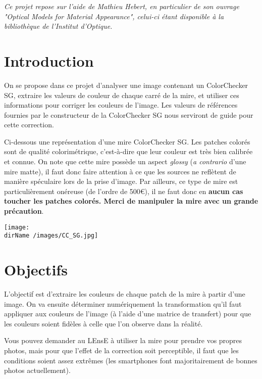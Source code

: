 
\textit{Ce projet repose sur l'aide de Mathieu Hebert, en particulier de son ouvrage "Optical Models for Material Appearance", celui-ci étant disponible à la bibliothèque de l'Institut d'Optique.
}
\section{Introduction}

On se propose dans ce projet d'analyser une image contenant un ColorChecker SG, extraire les valeurs de couleur de chaque carré de la mire, et utiliser ces informations pour corriger les couleurs de l’image. Les valeurs de références fournies par le constructeur de la ColorChecker SG nous serviront de guide pour cette correction.

\medskip

Ci-dessous une représentation d'une mire ColorChecker SG. Les patches colorés sont de qualité colorimétrique, c'est-à-dire que leur couleur est très bien calibrée et connue. On note que cette mire possède un aspect \textit{glossy} (\textit{a contrario} d'une mire matte), il faut donc faire attention à ce que les sources ne reflètent de manière spéculaire lors de la prise d'image. 
Par ailleurs, ce type de mire est particulièrement onéreuse (de l'ordre de 500€), il ne faut donc en \textbf{aucun cas toucher les patches colorés. Merci de manipuler la mire avec un grande précaution}. 

\begin{center}
	\texttt{[image:  \\dirName /images/CC\_SG.jpg]}
\end{center}


\section{Objectifs}
L'objectif est d'extraire les couleurs de chaque patch de la mire à partir d'une image. On va ensuite déterminer numériquement la transformation qu'il faut appliquer aux couleurs de l'image (à l'aide d'une matrice de transfert) pour que les couleurs soient fidèles à celle que l'on observe dans la réalité. 

Vous pouvez demander au LEnsE à utiliser la mire pour prendre vos propres photos, mais pour que l'effet de la correction soit perceptible, il faut que les conditions soient assez extrêmes (les smartphones font majoritairement de bonnes photos actuellement).  

